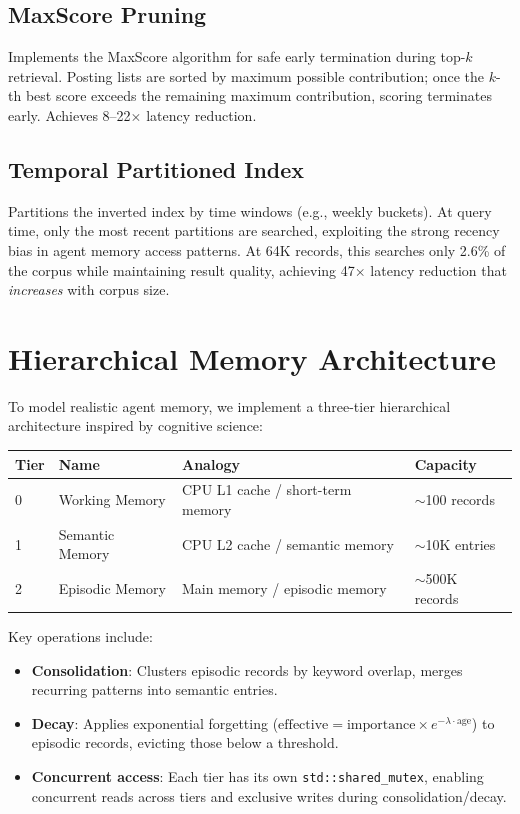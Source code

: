 \documentclass[11pt]{article}
\begin{document}
\subsection{MaxScore Pruning}
Implements the MaxScore algorithm for safe early termination during top-$k$ retrieval. Posting lists are sorted by maximum possible contribution; once the $k$-th best score exceeds the remaining maximum contribution, scoring terminates early. Achieves 8--22$\times$ latency reduction.

\subsection{Temporal Partitioned Index}
Partitions the inverted index by time windows (e.g., weekly buckets). At query time, only the most recent partitions are searched, exploiting the strong recency bias in agent memory access patterns. At 64K records, this searches only 2.6\% of the corpus while maintaining result quality, achieving 47$\times$ latency reduction that \textit{increases} with corpus size.

\section{Hierarchical Memory Architecture}

To model realistic agent memory, we implement a three-tier hierarchical architecture inspired by cognitive science:

\begin{center}
\begin{tabular}{llll}
\toprule
\textbf{Tier} & \textbf{Name} & \textbf{Analogy} & \textbf{Capacity} \\
\midrule
0 & Working Memory  & CPU L1 cache / short-term memory & $\sim$100 records \\
1 & Semantic Memory & CPU L2 cache / semantic memory   & $\sim$10K entries \\
2 & Episodic Memory & Main memory / episodic memory     & $\sim$500K records \\
\bottomrule
\end{tabular}
\end{center}

\noindent Key operations include:
\begin{itemize}[nosep]
    \item \textbf{Consolidation}: Clusters episodic records by keyword overlap, merges recurring patterns into semantic entries.
    \item \textbf{Decay}: Applies exponential forgetting ($\text{effective} = \text{importance} \times e^{-\lambda \cdot \text{age}}$) to episodic records, evicting those below a threshold.
    \item \textbf{Concurrent access}: Each tier has its own \texttt{std::shared\_mutex}, enabling concurrent reads across tiers and exclusive writes during consolidation/decay.
\end{itemize}
\end{document}
